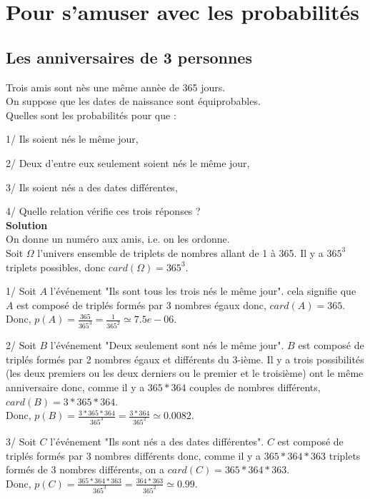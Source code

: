 \documentclass[a4paper,11pt]{book}
\begin{document}
\chapter{Pour s'amuser avec les probabilit\'es}
\section{Les anniversaires de 3 personnes}
Trois amis sont n\`es une m\^eme ann\`ee de 365 jours.\\
On suppose que les dates de naissance sont \'equiprobables.\\
Quelles sont les probabilit\'es pour que :

1/ Ils soient n\'es le m\^eme jour,

2/ Deux d'entre eux seulement soient n\'es le m\^eme jour,

3/ Ils soient n\'es a des dates diff\'erentes,

4/ Quelle relation v\'erifie ces trois r\'eponses ?\\

{\bf Solution}\\
On donne un num\'ero aux amis, i.e. on les ordonne.\\
Soit $\Omega$ l'univers ensemble de triplets de nombres allant de 1 \`a 365.
Il y a $365^3$ triplets possibles, donc   $card(\Omega)=365^3$.

1/ Soit $A$ l'\'ev\'enement "Ils sont tous les trois n\'es le m\^eme jour". cela signifie que 
$A$ est compos\'e de tripl\'es form\'es par 3 nombres \'egaux donc, 
$card(A)=365$. \\
Donc, $p(A)=\frac{365}{365^3}=\frac{1}{365^2}\simeq 7.5e-06$.

2/ Soit $B$ l'\'ev\'enement "Deux seulement sont n\'es le m\^eme jour".
$B$ est compos\'e de tripl\'es form\'es par 2 nombres \'egaux et diff\'erents 
du 3-i\`eme. Il  y a trois possibilit\'es (les deux premiers  ou les deux 
derniers ou le premier et le troisi\`eme)  ont le m\^eme anniversaire donc,
comme il y a $365*364$ couples de nombres diff\'erents, $card(B)=3*365*364$.\\
Donc, $p(B)=\frac{3*365*364}{365^3}=\frac{3*364}{365^2}\simeq 0.0082$.

3/ Soit $C$ l'\'ev\'enement "Ils sont n\'es a des dates diff\'erentes".
$C$ est compos\'e de tripl\'es form\'es par 3 nombres diff\'erents donc,
comme il y a $365*364*363$ triplets form\'es de 3 nombres diff\'erents, on a
$card(C)=365*364*363$.\\
Donc, $p(C)=\frac{365*364*363}{365^3}=\frac{364*363}{365^2}\simeq 0.99$.
\end{document}

